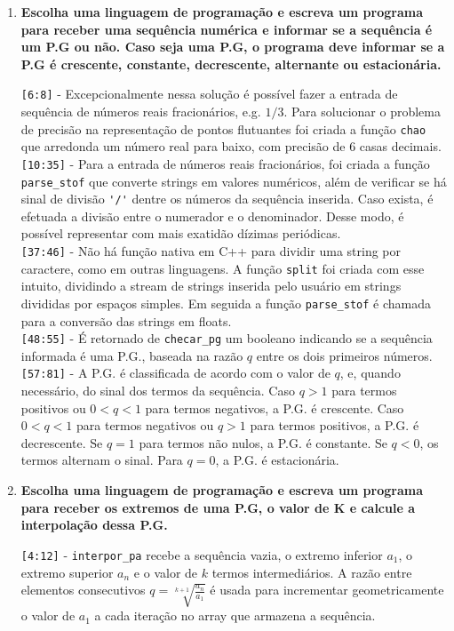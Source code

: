 \begin{enumerate}
	\item \textbf{Escolha uma linguagem de programação e escreva um programa para receber uma sequência numérica e informar se a sequência é um P.G ou não. Caso seja uma P.G, o programa deve informar se a P.G é crescente, constante, decrescente, alternante ou estacionária.}
	
	\verb|[6:8]| - Excepcionalmente nessa solução é possível fazer a entrada de sequência de números reais fracionários, e.g. $1/3$. Para solucionar o problema de precisão na representação de pontos flutuantes foi criada a função \verb|chao| que arredonda um número real para baixo, com precisão de 6 casas decimais.\\
	\verb|[10:35]| - Para a entrada de números reais fracionários, foi criada a função \verb|parse_stof| que converte strings em valores numéricos, além de verificar se há sinal de divisão \verb|'/'| dentre os números da sequência inserida. Caso exista, é efetuada a divisão entre o numerador e o denominador. Desse modo, é possível representar com mais exatidão dízimas periódicas.\\
	\verb|[37:46]| - Não há função nativa em C++ para dividir uma string por caractere, como em outras linguagens. A função \verb|split| foi criada com esse intuito, dividindo a stream de strings inserida pelo usuário em strings divididas por espaços simples. Em seguida a função \verb|parse_stof| é chamada para a conversão das strings em floats.\\
	\verb|[48:55]| - É retornado de \verb|checar_pg| um booleano indicando se a sequência informada é uma P.G., baseada na razão $q$ entre os dois primeiros números.\\
	\verb|[57:81]| - A P.G. é classificada de acordo com o valor de $q$, e, quando necessário, do sinal dos termos da sequência. Caso $q > 1$ para termos positivos ou $0 < q < 1$ para termos negativos, a P.G. é crescente. Caso $0 < q < 1$ para termos negativos ou $q > 1$ para termos positivos, a P.G. é decrescente. Se $q = 1$ para termos não nulos, a P.G. é constante. Se $q < 0$, os termos alternam o sinal. Para $q = 0$, a P.G. é estacionária.
	
	\item \textbf{Escolha uma linguagem de programação e escreva um programa para receber os extremos de uma P.G, o valor de K e calcule a interpolação dessa P.G.}
	
	\verb|[4:12]| - \verb|interpor_pa| recebe a sequência vazia, o extremo inferior $a_1$, o extremo superior $a_ n$ e o valor de $k$ termos intermediários. A razão entre elementos consecutivos $q = \sqrt[k+1]{\frac{a_n}{a_1}}$ é usada para incrementar geometricamente o valor de $a_1$ a cada iteração no array que armazena a sequência.
	

\end{enumerate}
